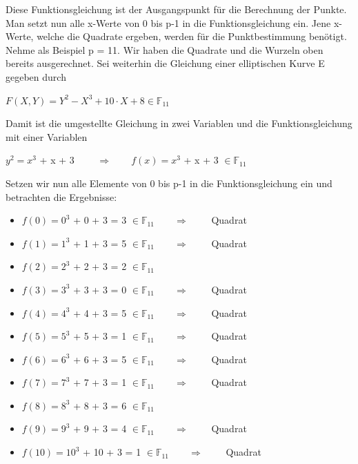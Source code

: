 Diese Funktionsgleichung ist der Ausgangspunkt für die Berechnung der Punkte. Man setzt nun alle x-Werte von 0 bis p-1 in die Funktionsgleichung ein. Jene x-Werte, welche die Quadrate ergeben, werden für die Punktbestimmung benötigt. Nehme als Beispiel p = 11. Wir haben die Quadrate und die Wurzeln oben bereits ausgerechnet. Sei weiterhin die Gleichung einer elliptischen Kurve E gegeben durch
\begin{center}
$F(X, Y) =  Y^{2} - X^{3} + 10 \cdot X + 8 \in \mathbb{F}_{11}$
\end{center}

Damit ist die umgestellte Gleichung in zwei Variablen und die Funktionsgleichung mit einer Variablen
\begin{center}
$y^{2} =  x^{3}$ + x + 3 $\qquad \Longrightarrow \qquad f(x) =  x^{3}$ + x + 3 $\in \mathbb{F}_{11}$
\end{center}
Setzen wir nun alle Elemente von 0 bis p-1 in die Funktionsgleichung ein und betrachten die Ergebnisse:

\begin{itemize}
\item $f(0) =  0^{3}$ + 0 + 3 = 3 $\in \mathbb{F}_{11} \qquad \Longrightarrow \qquad$ Quadrat
\item $f(1) =  1^{3}$ + 1 + 3 = 5 $\in \mathbb{F}_{11} \qquad \Longrightarrow \qquad$ Quadrat
\item $f(2) =  2^{3}$ + 2 + 3 = 2 $\in \mathbb{F}_{11}$
\item $f(3) =  3^{3}$ + 3 + 3 = 0 $\in \mathbb{F}_{11} \qquad \Longrightarrow \qquad$ Quadrat
\item $f(4) =  4^{3}$ + 4 + 3 = 5 $\in \mathbb{F}_{11} \qquad \Longrightarrow \qquad$ Quadrat
\item $f(5) =  5^{3}$ + 5 + 3 = 1 $\in \mathbb{F}_{11} \qquad \Longrightarrow \qquad$ Quadrat
\item $f(6) =  6^{3}$ + 6 + 3 = 5 $\in \mathbb{F}_{11} \qquad \Longrightarrow \qquad$ Quadrat
\item $f(7) =  7^{3}$ + 7 + 3 = 1 $\in \mathbb{F}_{11} \qquad \Longrightarrow \qquad$ Quadrat
\item $f(8) =  8^{3}$ + 8 + 3 = 6 $\in \mathbb{F}_{11}$
\item $f(9) =  9^{3}$ + 9 + 3 = 4 $\in \mathbb{F}_{11} \qquad \Longrightarrow \qquad$ Quadrat
\item $f(10) = 10^{3}$ + 10 + 3 = 1 $\in \mathbb{F}_{11} \qquad \Longrightarrow \qquad$ Quadrat
\end{itemize}

